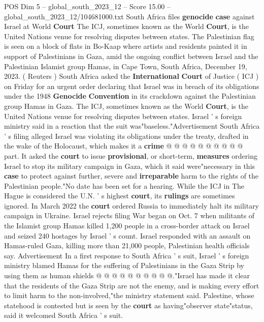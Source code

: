 \begin{textsample}{POS Dim 5 – global\_south\_2023\_12 – Score 15.00 – global\_south\_2023\_12/104681000.txt}  \label{ex:f5_pos_217}
South Africa files \textbf{genocide} \textbf{case} against Israel at World \textbf{Court} The ICJ, sometimes known as the World \textbf{Court}, is the United Nations venue for resolving disputes between states.
The Palestinian flag is seen on a block of flats in Bo-Kaap where artists and residents painted it in support of Palestinians in Gaza, amid the ongoing conflict between Israel and the Palestinian Islamist group Hamas, in Cape Town, South Africa, December 19, 2023. ( Reuters ) South Africa asked the \textbf{International} \textbf{Court} of Justice ( ICJ ) on Friday for an urgent order declaring that Israel was in breach of its obligations under the 1948 \textbf{Genocide} \textbf{Convention} in its crackdown against the Palestinian group Hamas in Gaza.
The ICJ, sometimes known as the World \textbf{Court}, is the United Nations venue for resolving disputes between states.
Israel ' s foreign ministry said in a reaction that the suit was"baseless."Advertisement South Africa ' s filing alleged Israel was violating its obligations under the treaty, drafted in the wake of the Holocaust, which makes it a \textbf{crime} @ @ @ @ @ @ @ @ @ @ part.
It asked the \textbf{court} to issue \textbf{provisional}, or short-term, \textbf{measures} ordering Israel to stop its military campaign in Gaza, which it said were"necessary in this \textbf{case} to protect against further, severe and \textbf{irreparable} harm to the rights of the Palestinian people."No date has been set for a hearing.
While the ICJ in The Hague is considered the U.N. ' s highest \textbf{court}, its \textbf{rulings} are sometimes ignored.
In March 2022 the \textbf{court} ordered Russia to immediately halt its military campaign in Ukraine.
Israel rejects filing War began on Oct. 7 when militants of the Islamist group Hamas killed 1,200 people in a cross-border attack on Israel and seized 240 hostages by Israel ' s count.
Israel responded with an assault on Hamas-ruled Gaza, killing more than 21,000 people, Palestinian health officials say.
Advertisement In a first response to South Africa ' s suit, Israel ' s foreign ministry blamed Hamas for the suffering of Palestinians in the Gaza Strip by using them as human shields @ @ @ @ @ @ @ @ @ @."Israel has made it clear that the residents of the Gaza Strip are not the enemy, and is making every effort to limit harm to the non-involved,"the ministry statement said.
Palestine, whose statehood is contested but is seen by the \textbf{court} as having"observer state"status, said it welcomed South Africa ' s suit.

\end{textsample}

